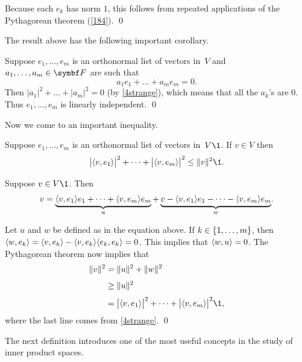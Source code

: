 
\proof
Because each $e_k$ has norm $1$, this follows from repeated applications of the Pythagorean theorem (\ref{184}).
\qed

The result above has the following important corollary.


\proof
Suppose $e_1, \dots, e_m$ is an orthonormal list of vectors in~$V$ and
$a_1, \dots, a_m \in \F{}$ are such that
\[
a_1 e_1 + \dots + a_m e_m = 0.
\]
Then $| a_1|^2 + \dots + |a_m|^2 = 0$ (by \ref{4strange}), which means that all the
$a_k$'s are $0$. Thus $e_1, \dots, e_m$ is linearly independent.
\qed


Now we come to an important inequality.

\medskip

{Suppose $e_1, \dots, e_m$ is an orthonormal list of vectors in~$V\1$. If $v \in V$ then
\[
\abs[\big]{\ip{v, e_1}}^2 + \cdots + \abs[\big]{\ip{v, e_m}}^2 \le \norm{v}^2\1.
\]
}

\proof
Suppose $v \in V\1$. Then
\[
v =\underbrace{\langle v, e_1\rangle e_1 + \cdots + \langle v, e_m\rangle e_m }_u +
\underbrace{ v - \langle v, e_1\rangle e_1 - \cdots - \langle v, e_m\rangle e_m }_w\!.
\]

Let $u$ and $w$ be defined as in the equation above.
If $k \in \{1, \ldots, m\}$, then $\langle w, e_k\rangle = \langle v, e_k\rangle - \langle v, e_k\rangle \langle e_k, e_k\rangle = 0$. This implies that $\langle w, u\rangle = 0$. The Pythagorean theorem now implies that
\begin{align*}
\norm{v}^2 &= \norm{u}^2 + \norm{w}^2 \\[3bp]
&\ge \norm{u}^2 \\[3bp]
&= \abs[\big]{\ip{v, e_1}}^2 + \cdots + \abs[\big]{\ip{v, e_m}}^2\1,
\end{align*}
where the last line comes from \ref{4strange}.
\qed

\pagebreak[2]

The next definition introduces one of the most useful concepts in the study of inner product spaces.

